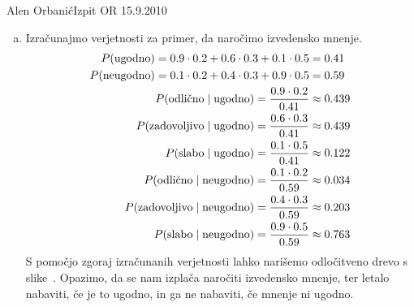 \begin{naloga}{Alen Orbanić}{Izpit OR 15.9.2010}
\begin{odgovor}
\begin{enumerate}[(a)]
\item Izračunajmo verjetnosti za primer, da naročimo izvedensko mnenje.
\begin{align*}
P(\text{ugodno}) = 0.9 \cdot 0.2 + 0.6 \cdot 0.3 + 0.1 \cdot 0.5 &= 0.41 \\
P(\text{neugodno}) = 0.1 \cdot 0.2 + 0.4 \cdot 0.3 + 0.9 \cdot 0.5 &= 0.59 \\
P(\text{odlično} \mid \text{ugodno}) = {0.9 \cdot 0.2 \over 0.41}
&\approx 0.439 \\
P(\text{zadovoljivo} \mid \text{ugodno}) = {0.6 \cdot 0.3 \over 0.41}
&\approx 0.439 \\
P(\text{slabo} \mid \text{ugodno}) = {0.1 \cdot 0.5 \over 0.41}
&\approx 0.122 \\
P(\text{odlično} \mid \text{neugodno}) = {0.1 \cdot 0.2 \over 0.59}
&\approx 0.034 \\
P(\text{zadovoljivo} \mid \text{neugodno}) = {0.4 \cdot 0.3 \over 0.59}
&\approx 0.203 \\
P(\text{slabo} \mid \text{neugodno}) = {0.9 \cdot 0.5 \over 0.59}
&\approx 0.763
\end{align*}
S pomočjo zgoraj izračunanih verjetnosti
lahko narišemo odločitveno drevo s slike~\fig.
Opazimo,
da se nam izplača naročiti izvedensko mnenje,
ter letalo nabaviti, če je to ugodno,
in ga ne nabaviti, če mnenje ni ugodno.
\end{enumerate}
%
\begin{slika}
\makebox[\textwidth][c]{
\pgfslika
}
\end{slika}
\end{odgovor}
\end{naloga}
